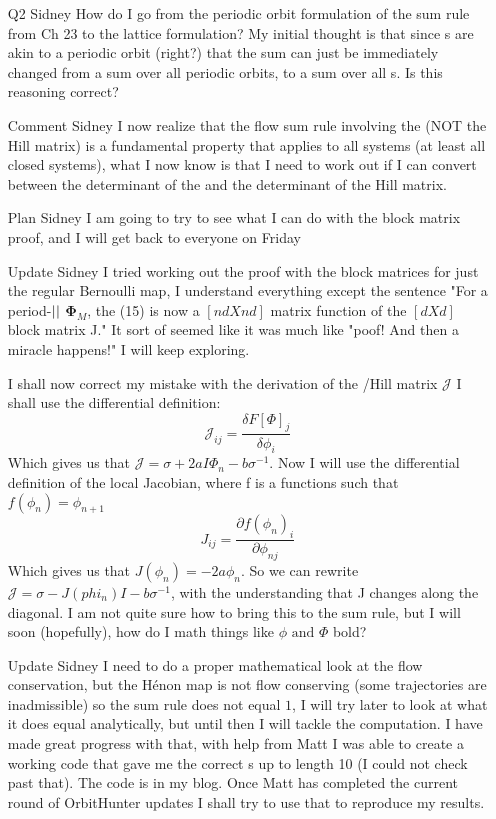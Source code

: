 {\begin{itemize}
\item[Q2 Sidney]
How do I go from the periodic orbit formulation of the sum rule from Ch 23 to the lattice formulation? My initial thought is that since {\lattstate}s are akin to a periodic orbit (right?) that the sum can just be immediately changed from a sum over all periodic orbits, to a sum over all {\lattstate}s. Is this reasoning correct?

\item[Comment Sidney]
I now realize that the flow sum rule involving the {\jacobianOrb} (NOT the Hill matrix) is a fundamental property that applies to all systems (at least all closed systems), what I now know is that I need to work out if I can convert between the determinant of the {\jacobianOrb} and the determinant of the Hill matrix.

\item[Plan Sidney]
I am going to try to see what I can do with the block matrix proof, and I will get back to everyone on Friday

\item[Update Sidney]
I tried working out the proof with the block matrices for just the
regular Bernoulli map, I understand everything except the sentence "For a
period-${||}$ {\lattstate} $\mathbf{\Phi}_M$, the {\jacobianOrb}
(15) is now a $[ndXnd]$ matrix function of the $[dXd]$ block matrix J."
It sort of seemed like it was much like "poof! And then a miracle
happens!" I will keep exploring.

I shall now correct my mistake with the derivation of the {\jacobianOrb}/Hill matrix $\mathcal{J}$ I shall use the differential definition:
$$\mathcal{J}_{ij}=\frac{\delta F[\Phi]_j}{\delta\phi_i}$$
Which gives us that $\mathcal{J}=\sigma+2aI\Phi_n-b\sigma^{-1}$. Now I will use the differential definition of the local Jacobian, where f is a functions such that $f(\phi_n)=\phi_{n+1}$
$$J_{ij}=\frac{\partial f(\phi_n)_i}{\partial \phi_{nj}}$$
Which gives us that $J(\phi_n)=-2a\phi_n$. So we can rewrite $\mathcal{J}=\sigma-J(phi_n)I-b\sigma^{-1}$, with the understanding that J changes along the diagonal. I am not quite sure how to bring this to the sum rule, but I will soon (hopefully), how do I math things like $\phi\text{ and }\Phi$ bold?

\item[Update Sidney]
I need to do a proper mathematical look at the flow conservation, but the
H\'enon map is not flow conserving (some trajectories are inadmissible)
so the sum rule does not equal $1$, I will try later to look at what it
does equal analytically, but until then I will tackle the computation. I
have made great progress with that, with help from Matt I was able to
create a working code that gave me the correct {\orbit}s up to length
10 (I could not check past that). The code is in my blog. Once Matt has
completed the current round of OrbitHunter updates I shall try to use
that to reproduce my results.


\end{itemize}}

